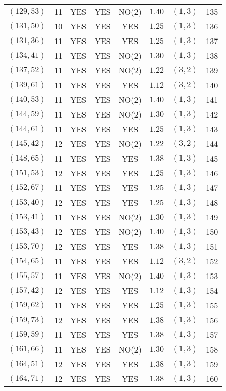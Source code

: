 \begin{longtable}{|c|c|c|c|c|c|c|c|}
$(129,53)$ & 11 & YES & YES & NO(2) & $1.40$ & $(1,3)$ & 135\\
$(131,50)$ & 10 & YES & YES & YES & $1.25$ & $(1,3)$ & 136\\
$(131,36)$ & 11 & YES & YES & YES & $1.25$ & $(1,3)$ & 137\\
$(134,41)$ & 11 & YES & YES & NO(2) & $1.30$ & $(1,3)$ & 138\\
$(137,52)$ & 11 & YES & YES & NO(2) & $1.22$ & $(3,2)$ & 139\\
$(139,61)$ & 11 & YES & YES & YES & $1.12$ & $(3,2)$ & 140\\
$(140,53)$ & 11 & YES & YES & NO(2) & $1.40$ & $(1,3)$ & 141\\
$(144,59)$ & 11 & YES & YES & NO(2) & $1.30$ & $(1,3)$ & 142\\
$(144,61)$ & 11 & YES & YES & YES & $1.25$ & $(1,3)$ & 143\\
$(145,42)$ & 12 & YES & YES & NO(2) & $1.22$ & $(3,2)$ & 144\\
$(148,65)$ & 11 & YES & YES & YES & $1.38$ & $(1,3)$ & 145\\
$(151,53)$ & 12 & YES & YES & YES & $1.25$ & $(1,3)$ & 146\\
$(152,67)$ & 11 & YES & YES & YES & $1.25$ & $(1,3)$ & 147\\
$(153,40)$ & 12 & YES & YES & YES & $1.25$ & $(1,3)$ & 148\\
$(153,41)$ & 11 & YES & YES & NO(2) & $1.30$ & $(1,3)$ & 149\\
$(153,43)$ & 12 & YES & YES & NO(2) & $1.40$ & $(1,3)$ & 150\\
$(153,70)$ & 12 & YES & YES & YES & $1.38$ & $(1,3)$ & 151\\
$(154,65)$ & 11 & YES & YES & YES & $1.12$ & $(3,2)$ & 152\\
$(155,57)$ & 11 & YES & YES & NO(2) & $1.40$ & $(1,3)$ & 153\\
$(157,42)$ & 12 & YES & YES & YES & $1.12$ & $(1,3)$ & 154\\
$(159,62)$ & 11 & YES & YES & YES & $1.25$ & $(1,3)$ & 155\\
$(159,73)$ & 12 & YES & YES & YES & $1.38$ & $(1,3)$ & 156\\
$(159,59)$ & 11 & YES & YES & YES & $1.38$ & $(1,3)$ & 157\\
$(161,66)$ & 11 & YES & YES & NO(2) & $1.30$ & $(1,3)$ & 158\\
$(164,51)$ & 12 & YES & YES & YES & $1.38$ & $(1,3)$ & 159\\
$(164,71)$ & 12 & YES & YES & YES & $1.38$ & $(1,3)$ & 160\\

\end{longtable}
